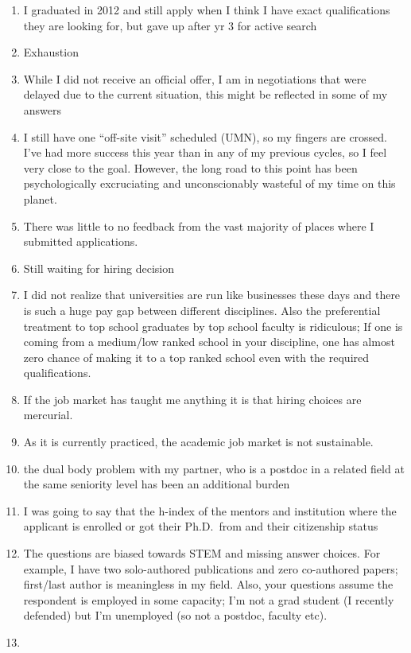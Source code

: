 \documentclass[]{article}
\begin{document}
\begin{enumerate}
\item
  I graduated in 2012 and still apply when I think I have exact
  qualifications they are looking for, but gave up after yr 3 for active
  search
\item
  Exhaustion
\item
  While I did not receive an official offer, I am in negotiations that
  were delayed due to the current situation, this might be reflected in
  some of my answers
\item
  I still have one ``off-site visit'' scheduled (UMN), so my fingers are
  crossed. I've had more success this year than in any of my previous
  cycles, so I feel very close to the goal. However, the long road to
  this point has been psychologically excruciating and unconscionably
  wasteful of my time on this planet.
\item
  There was little to no feedback from the vast majority of places where
  I submitted applications.
\item
  Still waiting for hiring decision
\item
  I did not realize that universities are run like businesses these days
  and there is such a huge pay gap between different disciplines. Also
  the preferential treatment to top school graduates by top school
  faculty is ridiculous; If one is coming from a medium/low ranked
  school in your discipline, one has almost zero chance of making it to
  a top ranked school even with the required qualifications.
\item
  If the job market has taught me anything it is that hiring choices are
  mercurial.
\item
  As it is currently practiced, the academic job market is not
  sustainable.
\item
  the dual body problem with my partner, who is a postdoc in a related
  field at the same seniority level has been an additional burden
\item
  I was going to say that the h-index of the mentors and institution
  where the applicant is enrolled or got their Ph.D.~from and their
  citizenship status
\item
  The questions are biased towards STEM and missing answer choices. For
  example, I have two solo-authored publications and zero co-authored
  papers; first/last author is meaningless in my field. Also, your
  questions assume the respondent is employed in some capacity; I'm not
  a grad student (I recently defended) but I'm unemployed (so not a
  postdoc, faculty etc).
\item

\end{enumerate}
\end{document}
